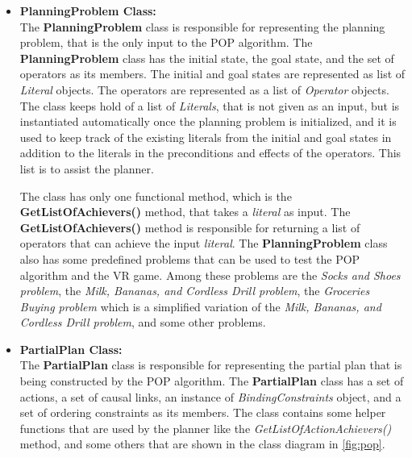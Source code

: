 \begin{itemize}
    \item \textbf{PlanningProblem Class:} \\
          The \textbf{PlanningProblem} class is responsible for representing the planning problem, that is the only input to the \acl{POP} algorithm. The \textbf{PlanningProblem} class has the initial state, the goal state, and the set of operators as its members. The initial and goal states are represented as list of \textit{Literal} objects. The operators are represented as a list of \textit{Operator} objects. The class keeps hold of a list of \textit{Literals}, that is not given as an input, but is instantiated automatically once the planning problem is initialized, and it is used to keep track of the existing literals from the initial and goal states in addition to the literals in the preconditions and effects of the operators. This list is to assist the planner.

          The class has only one functional method, which is the \textbf{GetListOfAchievers()} method, that takes a \textit{literal} as input. The \textbf{GetListOfAchievers()} method is responsible for returning a list of operators that can achieve the input \textit{literal}. The \textbf{PlanningProblem} class also has some predefined problems that can be used to test the \ac{POP} algorithm and the \ac{VR} game. Among these problems are the \textit{Socks and Shoes problem}, the \textit{Milk, Bananas, and Cordless Drill problem}, the \textit{Groceries Buying problem} which is a simplified variation of the \textit{Milk, Bananas, and Cordless Drill problem}, and some other problems.

    \item \textbf{PartialPlan Class:} \\
          The \textbf{PartialPlan} class is responsible for representing the partial plan that is being constructed by the \ac{POP} algorithm. The \textbf{PartialPlan} class has a set of actions, a set of causal links, an instance of \textit{BindingConstraints} object, and a set of ordering constraints as its members. The class contains some helper functions that are used by the planner like the \textit{GetListOfActionAchievers()} method, and some others that are shown in the class diagram in \autoref{fig:pop}.


\end{itemize}
